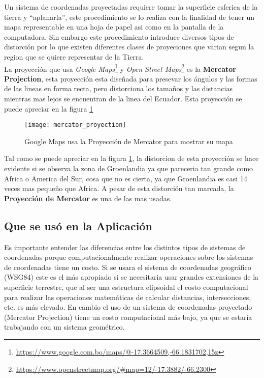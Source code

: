         Un sistema de coordenadas proyectadas requiere tomar la superficie esferica de la tierra y ``aplanarla'', este procedimiento se lo realiza con la finalidad de tener un mapa representable en una hoja de papel asi como en la pantalla de la computadora. Sin embargo este procedimiento introduce diversos tipos de distorci\'on por lo que existen diferentes clases de proyeciones que varian segun la region que se quiere representar de la Tierra.\\

        La proyecci\'on que usa \emph{Google Maps}\footnote{\url{https://www.google.com.bo/maps/@-17.3664509,-66.1831702,15z}} y \emph{Open Street Maps}\footnote{\url{https://www.openstreetmap.org/#map=12/-17.3882/-66.2300}} es la \textbf{Mercator Projection}\cite{gmaps_osm}, esta proyecci\'on esta dise\~nada para presevar los ángulos y las formas de las lineas en forma recta, pero distorciona los tama\~nos y las distancias mientras mas lejos se encuentran de la linea del Ecuador. Esta proyecci\'on se puede apreciar en la figura \ref{fig:mercator_proyection}

        \begin{figure}[H]
          \begin{center}
            \texttt{[image: mercator\_proyection]}
          \end{center}
          \caption[Sistema de coordenadas Proyectadas]{Google Maps usa la Proyección de Mercator para mostrar su mapa}
          \label{fig:mercator_proyection}
        \end{figure}

        Tal como se puede apreciar en la figura \ref{fig:mercator_proyection}, la distorcion de esta proyecci\'on se hace evidente si se observa la zona de Groenlandia ya que pareceria tan grande como Africa o America del Sur, cosa que no es cierta, ya que Groenlandia es casi 14 veces mas peque\~no que Africa. A pesar de esta distorci\'on tan marcada, la \textbf{Proyección de Mercator} es una de las mas usadas.
      \subsection{Que se us\'o en la Aplicaci\'on} %
      \label{sec:que_se_uso_en_la_aplicacion}
        Es importante entender las diferencias entre los distintos tipos de sistemas de coordenadas porque computacionalmente realizar operaciones sobre los sistemas de coordenadas tiene un costo.
        Si se usara el sistema de coordenadas geográfico (WSG84) este es el más apropiado si se necesitaria usar grandes extensiones de la superficie terrestre, que al ser una estructura elipsoidal el costo computacional para realizar las operaciones matemáticas de calcular distancias, intersecciones, etc. es más elevado. En cambio el uso de un sistema de coordenadas proyectado (Mercator Projection) tiene un costo computacional más bajo, ya que se estaría trabajando con un sistema geométrico.\\

